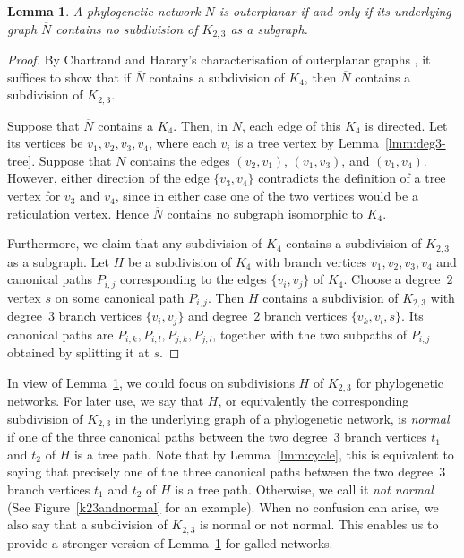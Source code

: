 \documentclass[pdflatex,sn-mathphys-num]{sn-jnl}
\theoremstyle{thmstyleone}%
\theoremstyle{thmstyletwo}%
\newtheorem{lemma}{Lemma}
\theoremstyle{thmstylethree}%
\begin{document}
\begin{lemma} \label{lmm:k4k23}
A phylogenetic network $N$ is outerplanar if and only if its underlying graph $\overline{N}$ contains no subdivision of $K_{2,3}$ as a subgraph.    
\end{lemma}
\begin{proof}
By Chartrand and Harary's characterisation of outerplanar graphs \cite{Chartrand-Harary}, 
it suffices to show that if $\overline{N}$ contains a subdivision of $K_4$, then $\overline{N}$ contains a subdivision of $K_{2,3}$.

Suppose that $\overline{N}$ contains a $K_4$. Then, in $N$, each edge of this $K_4$ is directed. Let its vertices be $v_1, v_2, v_3, v_4$, where each $v_i$ is a tree vertex by Lemma~\ref{lmm:deg3-tree}. Suppose that $N$ contains the edges $(v_2,v_1)$, $(v_1,v_3)$, and $(v_1,v_4)$. However, either direction of the edge $\{v_3,v_4\}$ contradicts the definition of a tree vertex for $v_3$ and $v_4$, since in either case one of the two vertices would be a reticulation vertex. Hence $\overline{N}$ contains no subgraph isomorphic to $K_4$.

Furthermore, we claim that any subdivision of $K_4$ contains a subdivision of $K_{2,3}$ as a subgraph. Let $H$ be a subdivision of $K_4$ with branch vertices $v_1, v_2, v_3, v_4$ and canonical paths $P_{i,j}$ corresponding to the edges $\{v_i, v_j\}$ of $K_4$. Choose a degree~$2$ vertex $s$ on some canonical path $P_{i,j}$. Then $H$ contains a subdivision of $K_{2,3}$ with degree~$3$ branch vertices $\{v_i, v_j\}$ and degree~$2$ branch vertices $\{v_k, v_l, s\}$. Its canonical paths are $P_{i,k}, P_{i,l}, P_{j,k}, P_{j,l}$, together with the two subpaths of $P_{i,j}$ obtained by splitting it at $s$.
\end{proof}

In view of Lemma~\ref{lmm:k4k23}, we could focus on 
subdivisions $H$ of $K_{2,3}$ for phylogenetic networks.
For later use, we say that $H$, or equivalently the corresponding subdivision of $K_{2,3}$ in the underlying graph of a phylogenetic network, is \emph{normal} if one of the three canonical paths between the two degree~$3$ branch vertices $t_1$ and $t_2$ of $H$ is a tree path. Note that by Lemma~\ref{lmm:cycle}, this is equivalent to saying that precisely one of the three canonical paths between the two degree~$3$ branch vertices $t_1$ and $t_2$ of $H$ is a tree path.
Otherwise, we call it \emph{not normal} (See Figure~\ref{k23andnormal} for an example). When no confusion can arise, we also say  that a subdivision of $K_{2,3}$ is normal or not normal. This enables us to provide a stronger version of Lemma~\ref{lmm:k4k23} for galled networks.  
\end{document}
